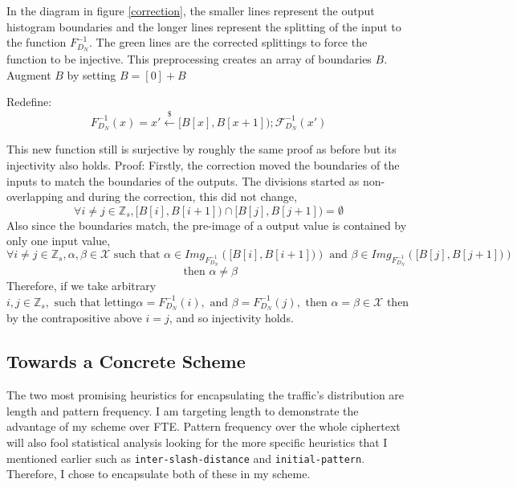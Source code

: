 \documentclass[ %
                    author={Samuel Russell},
                supervisor={Prof. Bogdan Warinschi},
                    degree={MEng},
                     title={Innocuous Ciphertexts},
                  subtitle={The DE-CENSOR Scheme},
                      type={research},
                      year={2018} ]{dissertation}
\begin{document}
In the diagram in figure \ref{correction}, the smaller lines represent the output histogram boundaries and the longer lines represent the splitting of the input to the function $F^{-1}_{D_N}$.
The green lines are the corrected splittings to force the function to be injective. This preprocessing creates an array of boundaries $B$. Augment $B$ by setting $B = [0] + B$

Redefine:
$$F^{-1}_{D_N}(x) = x' \xleftarrow{\$} [B[x], B[x+1]); \mathcal{F}^{-1}_{D_N}(x')$$

This new function still is surjective by roughly the same proof as before but its injectivity also holds.
Proof:
Firstly, the correction moved the boundaries of the inputs to match the boundaries of the outputs.
The divisions started as non-overlapping and during the correction, this did not change,
$$\forall i \neq j \in \mathbb{Z}_s, \big[ B[i],B[i+1] \big) \cap \big[ B[j],B[j+1] \big) = \emptyset$$
Also since the boundaries match, the pre-image of a output value is contained by only one input value,
$$ \forall i \neq j \in \mathbb{Z}_s, \alpha,\beta \in \mathcal{X} \text{ such that } \alpha \in Img_{F^{-1}_{D_N}}(\big[ B[i],B[i+1] \big)) \text{ and } \beta \in Img_{F^{-1}_{D_N}}(\big[ B[j],B[j+1] \big))$$
$$\text{ then } \alpha \neq \beta$$
Therefore, if we take arbitrary $i, j \in \mathbb{Z}_s, \text{ such that letting} \alpha = F^{-1}_{D_N}(i), \text{ and } \beta = F^{-1}_{D_N}(j), \text{ then } \alpha = \beta \in \mathcal{X}$ then by the contrapositive above $i=j$, and so injectivity holds.

\subsection{Towards a Concrete Scheme}

The two most promising heuristics for encapsulating the traffic's distribution are length and pattern frequency.
I am targeting length to demonstrate the advantage of my scheme over FTE. Pattern frequency over the whole ciphertext will also fool statistical analysis looking for the more specific heuristics that I mentioned earlier such as \texttt{inter-slash-distance} and \texttt{initial-pattern}.
Therefore, I chose to encapsulate both of these in my scheme.
\end{document}
